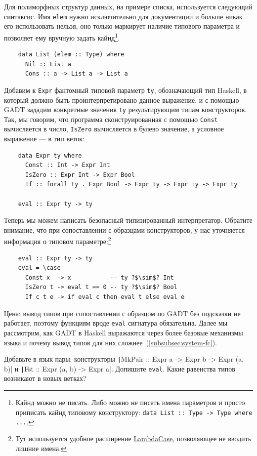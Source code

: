 Для полиморфных структур данных, на примере списка, используется следующий синтаксис.
Имя \texttt{elem} нужно исключительно для документации и больше никак его использовать нельзя, оно только маркирует наличие типового параметра и позволяет ему вручную задать кайнд\footnote{Кайнд можно не писать. Либо можно не писать имена параметров и просто приписать кайнд типовому конструктору: \texttt{data List :: Type -> Type where ...}.}.
\begin{verbatim}
    data List (elem :: Type) where
      Nil :: List a
      Cons :: a -> List a -> List a
\end{verbatim}

Добавим к \texttt{Expr} фантомный типовой параметр \texttt{ty}, обозначающий тип Haskell, в который должно быть проинтерпретировано данное выражение, и с помощью GADT зададим конкретные значения \texttt{ty} результирующим типам конструкторов.
Так, мы говорим, что программа сконструированная с помощью \texttt{Const} вычисляется в число, \texttt{IsZero} вычисляется в булево значение, а условное выражение --- в тип веток:
\begin{verbatim}
    data Expr ty where
      Const :: Int -> Expr Int
      IsZero :: Expr Int -> Expr Bool
      If :: forall ty . Expr Bool -> Expr ty -> Expr ty -> Expr ty

    eval :: Expr ty -> ty
\end{verbatim}

Теперь мы можем написать безопасный типизированный интерпретатор.
Обратите внимание, что при сопоставлении с образцами конструкторов, у нас уточняется информация о типовом параметре:\footnote{Тут используется удобное расширение \href{https://downloads.haskell.org/~ghc/9.0.1/docs/html/users_guide/exts/lambda_case.html}{LambdaCase}, позволяющее не вводить лишние имена.}
\begin{verbatim}
    eval :: Expr ty -> ty
    eval = \case
      Const x  -> x           -- ty ?$\sim$? Int
      IsZero t -> eval t == 0 -- ty ?$\sim$? Bool
      If c t e -> if eval c then eval t else eval e
\end{verbatim}

Цена: вывод типов при сопоставлении с образцом по GADT без подсказки не работает, поэтому функциям вроде \texttt{eval} сигнатура обязательна.
Далее мы рассмотрим, как GADT в Haskell выражаются через более базовые механизмы языка и почему вывод типов для них сложнее~(\ref{subsubsec:system-fc}).

\begin{task}
    Добавьте в язык пары: конструкторы \texttt|MkPair :: Expr a -> Expr b -> Expr (a, b)| и \texttt|Fst :: Expr (a, b) -> Expr a|.
    Допишите \texttt{eval}.
    Какие равенства типов возникают в новых ветках?
\end{task}

